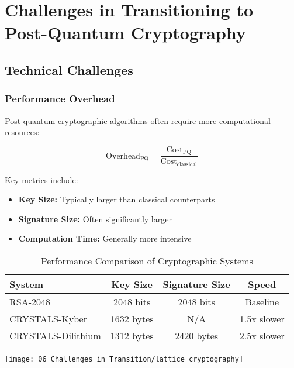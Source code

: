 \chapter{Challenges in Transitioning to Post-Quantum Cryptography}\label{chap:challenges}

\section{Technical Challenges}\label{sec:technical_challenges}

\subsection{Performance Overhead}\label{subsec:performance}
Post-quantum cryptographic algorithms often require more computational resources:

\begin{equation}\label{eq:overhead}
    \text{Overhead}_{\text{PQ}} = \frac{\text{Cost}_{\text{PQ}}}{\text{Cost}_{\text{classical}}}
\end{equation}

Key metrics include:
\begin{itemize}
    \item \textbf{Key Size:} Typically larger than classical counterparts
    \item \textbf{Signature Size:} Often significantly larger
    \item \textbf{Computation Time:} Generally more intensive
\end{itemize}

\begin{table}[h]
    \centering
    \caption{Performance Comparison of Cryptographic Systems}
    \label{tab:performance_comparison}
    \begin{tabular}{|l|c|c|c|}
        \hline
        \textbf{System} & \textbf{Key Size} & \textbf{Signature Size} & \textbf{Speed} \\
        \hline
        RSA-2048 & 2048 bits & 2048 bits & Baseline \\
        CRYSTALS-Kyber & 1632 bytes & N/A & 1.5x slower \\
        CRYSTALS-Dilithium & 1312 bytes & 2420 bytes & 2.5x slower \\
        \hline
    \end{tabular}
\end{table}

\texttt{[image: 06\_Challenges\_in\_Transition/lattice\_cryptography]}

